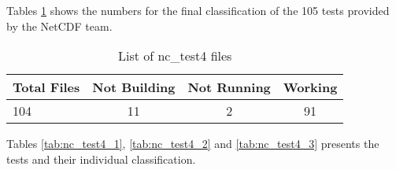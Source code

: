 Tables \ref{tab:nc_test4} shows the numbers for the final classification of the 105 tests provided by the NetCDF team.

\begin{table}[H]
\centering
\begin{tabular}{|l|c|c|c|}
\hline
\multicolumn{1}{|c|}{Total Files} & \multicolumn{1}{c|}{Not Building} & \multicolumn{1}{c|}{Not Running} & \multicolumn{1}{c|}{Working} \\ \hline \hline
104         &    11       &     2      &    91   \\ \hline \hline
\end{tabular}
\caption{\label{tab:nc_test4} List of nc\_test4 files}
\end{table}

Tables \ref{tab:nc_test4_1}, \ref{tab:nc_test4_2} and \ref{tab:nc_test4_3} presents the tests and their individual classification.

\clearpage

